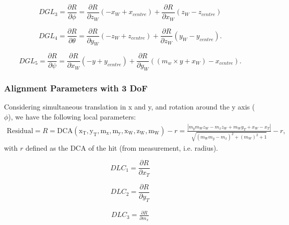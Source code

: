 \documentclass[a4paper,11pt]{article}
\begin{document}
\begin{equation}
DGL_3 = \frac{ \partial R}{\partial \phi} = \frac{ \partial R}{\partial z_W} (-x_W + x_{centre}) + \frac{ \partial R}{\partial x_W} (z_W - z_{centre})
\end{equation}


\begin{equation}
DGL_4 = \frac{ \partial R}{\partial \theta} = \frac{ \partial R}{\partial y_W} (-z_W + z_{centre}) + \frac{ \partial R}{\partial z_W} (y_W - y_{centre}).
\end{equation}

\begin{equation}
DGL_5 = \frac{ \partial R}{\partial \psi} = \frac{ \partial R}{\partial x_W} (-y + y_{centre}) + \frac{ \partial R}{\partial y_W} ((m_w \times y+x_W) - x_{centre}).
\end{equation}


\subsubsection{Alignment Parameters with 3 DoF}

Considering simultaneous translation in x and y, and rotation around the y axis ($\phi$), we have the following local parameters: \\ 


\begin{equation}
\begin{split}
\mathrm{Residual} = R = \mathrm{DCA(x_T, y_T, m_x, m_y, x_W, z_W, m_W)} -r = \frac{| m_ym_Wz_W-m_xz_W + m_Wy_T + x_W - x_T |}{\sqrt{(m_W m_y-m_x)^2+(m_W)^2+1}} -r,
\end{split}
\end{equation}
with $r$ defined as the DCA of the hit (from measurement, i.e.  radius). 

\begin{equation}
DLC_1 = \frac{\partial R}{\partial x_T} 
\end{equation}

\begin{equation}
DLC_2 = \frac{ \partial R}{\partial y_T} 
\end{equation}

\begin{equation}
\begin{split}
DLC_3 = \frac{ \partial R}{\partial m_x} 
\end{split}
\end{equation}
\end{document}
